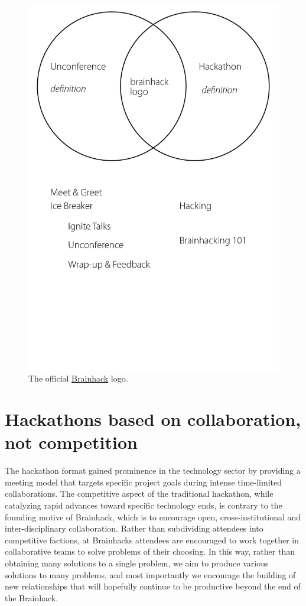 \documentclass[11pt]{bmc_article_s50}
\begin{document}
\begin{figure}[ht!]
\begin{center}
\includegraphics[width=.5\textwidth]{Figure_01-01}

 \caption{The official \href{http://www.brainhack.org}{Brainhack} logo.}
 \end{center}
\end{figure}

\section{Hackathons based on collaboration, not competition}\label{hackathons-based-on-collaboration-not-competition}

The hackathon format gained prominence in the technology sector by providing a meeting model that targets specific project goals during intense time-limited collaborations. The competitive aspect of the traditional hackathon, while catalyzing rapid advances toward specific technology ends, is contrary to the founding motive of Brainhack, which is to encourage open, cross-institutional and inter-disciplinary collaboration. Rather than subdividing attendees into competitive factions, at Brainhacks attendees are encouraged to work together in collaborative teams to solve problems of their choosing. In this way,  rather than obtaining many solutions to a single problem, we aim to produce various solutions to many problems,  and most importantly we encourage the building of new relationships that will hopefully continue to be productive beyond the end of the Brainhack.
\end{document}
